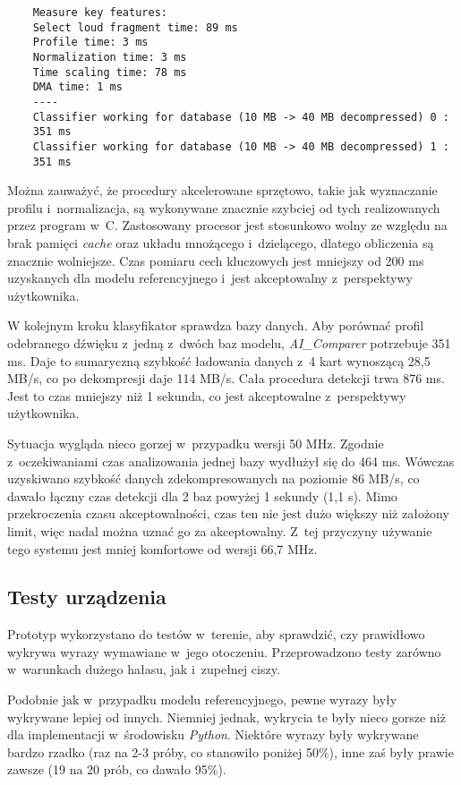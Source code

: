 \begin{lstlisting}
	Measure key features:
	Select loud fragment time: 89 ms
	Profile time: 3 ms
	Normalization time: 3 ms
	Time scaling time: 78 ms
	DMA time: 1 ms
	----
	Classifier working for database (10 MB -> 40 MB decompressed) 0 :
	351 ms
	Classifier working for database (10 MB -> 40 MB decompressed) 1 :
	351 ms
\end{lstlisting}

Można zauważyć, że procedury akcelerowane sprzętowo, takie jak wyznaczanie profilu i~normalizacja, są wykonywane znacznie szybciej od tych realizowanych przez program w~C. Zastosowany procesor jest stosunkowo wolny ze względu na brak pamięci \textit{cache} oraz układu mnożącego i~dzielącego, dlatego obliczenia są znacznie wolniejsze. Czas pomiaru cech kluczowych jest mniejszy od 200 ms uzyskanych dla modelu referencyjnego i~jest akceptowalny z~perspektywy użytkownika.

W kolejnym kroku klasyfikator sprawdza bazy danych. Aby porównać profil odebranego dźwięku z~jedną z~dwóch baz modelu, \textit{AI\_Comparer} potrzebuje 351 ms. Daje to sumaryczną szybkość ładowania danych z~4 kart wynoszącą 28,5 MB/s, co po dekompresji daje 114 MB/s. Cała procedura detekcji trwa 876 ms. Jest to czas mniejszy niż 1 sekunda, co jest akceptowalne z~perspektywy użytkownika.

Sytuacja wygląda nieco gorzej w~przypadku wersji 50 MHz. Zgodnie z~oczekiwaniami czas analizowania jednej bazy wydłużył się do 464 ms. Wówczas uzyskiwano szybkość danych zdekompresowanych na poziomie 86 MB/s, co dawało łączny czas detekcji dla 2 baz powyżej 1 sekundy (1,1 s). Mimo przekroczenia czasu akceptowalności, czas ten nie jest dużo większy niż założony limit, więc nadal można uznać go za akceptowalny. Z~tej przyczyny używanie tego systemu jest mniej komfortowe od wersji 66,7 MHz.

\subsection{Testy urządzenia}

Prototyp wykorzystano do testów w~terenie, aby sprawdzić, czy prawidłowo wykrywa wyrazy wymawiane w~jego otoczeniu. Przeprowadzono testy zarówno w~warunkach dużego hałasu, jak i~zupełnej ciszy.

Podobnie jak w~przypadku modelu referencyjnego, pewne wyrazy były wykrywane lepiej od innych. Niemniej jednak, wykrycia te były nieco gorsze niż dla implementacji w~środowisku \textit{Python}. Niektóre wyrazy były wykrywane bardzo rzadko (raz na 2-3 próby, co stanowiło poniżej 50\%), inne zaś były prawie zawsze (19 na 20 prób, co dawało 95\%).


